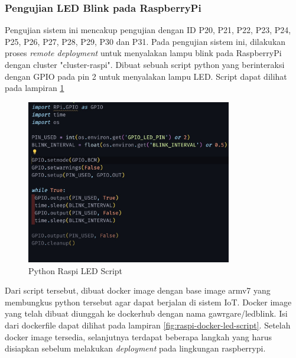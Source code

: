 \subsubsection{Pengujian LED Blink pada RaspberryPi}

Pengujian sistem ini mencakup pengujian dengan ID P20, P21, P22, P23, P24, P25, P26, P27, P28, P29, P30 dan P31. Pada pengujian sistem ini, dilakukan proses \textit{remote deployment} untuk menyalakan lampu blink pada RaspberryPi dengan cluster "cluster-raspi". Dibuat sebuah script python yang berinteraksi dengan GPIO pada pin 2 untuk menyalakan lampu LED. Script dapat dilihat pada lampiran \ref{fig:raspi-python-led-script}

\begin{figure}[ht]
  \centering
  \includegraphics[width=0.8\textwidth]{resources/chapter-4/pengujian/pengujian-sistem-raspi-09-led.jpg}
  \caption{Python Raspi LED Script}
  \label{fig:raspi-python-led-script}
\end{figure}

Dari script tersebut, dibuat docker image dengan base image armv7 yang membungkus python tersebut agar dapat berjalan di sistem IoT. Docker image yang telah dibuat diunggah ke dockerhub dengan nama {gawrgare/led\textunderscore blink}. Isi dari dockerfile dapat dilihat pada lampiran \ref{fig:raspi-docker-led-script}. Setelah docker image tersedia, selanjutnya terdapat beberapa langkah yang harus disiapkan sebelum melakukan \textit{deployment} pada lingkungan raspberrypi.

